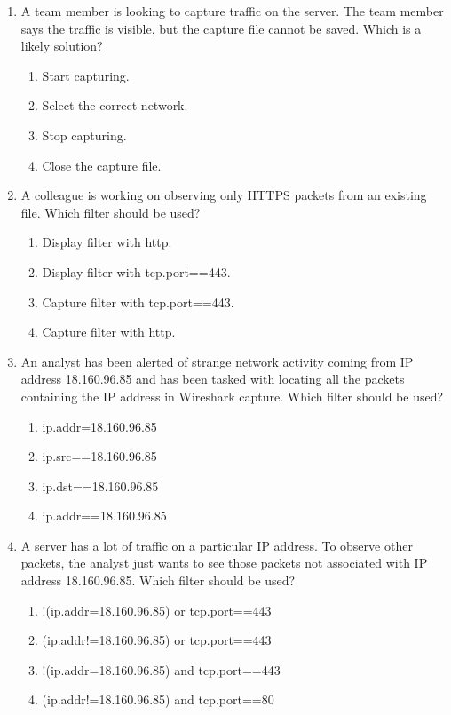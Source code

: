 \documentclass{article}
\newcommand{\incorrectOption}{\item[\textbf{\Circle}]}
\begin{document}
\begin{enumerate}[leftmargin=*, label=\textbf{Q\arabic*}, itemsep=-5pt]
\item A team member is looking to capture traffic on the server. The
  team member says the traffic is visible, but the capture file cannot
  be saved. Which is a likely solution? 
  \begin{enumerate}[itemsep=-3.5pt, label={}]
  \incorrectOption Start capturing.
  \incorrectOption Select the correct network. 
  \incorrectOption Stop capturing.
  \incorrectOption Close the capture file.
  \end{enumerate}  
 
\item A colleague is working on observing only HTTPS packets from an
  existing file. Which filter should be used?  
  \begin{enumerate}[itemsep=-3.5pt, label={}]
  \incorrectOption Display filter with {http}. 
  \incorrectOption Display filter with {tcp.port==443}.
  \incorrectOption Capture filter with {tcp.port==443}.
  \incorrectOption Capture filter with {http}.
  \end{enumerate}
 
\item An analyst has been alerted of strange network activity coming
  from IP address 18.160.96.85 and has been tasked with locating all
  the packets containing the IP address in Wireshark capture. Which
  filter should be used?  
  \begin{enumerate}[itemsep=-3.5pt, label={}]
  \incorrectOption ip.addr=18.160.96.85
  \incorrectOption ip.src==18.160.96.85
  \incorrectOption ip.dst==18.160.96.85
  \incorrectOption ip.addr==18.160.96.85
\end{enumerate}

\item A server has a lot of traffic on a particular IP address. To
  observe other packets, the analyst just wants to see those packets
  not associated with IP address 18.160.96.85. Which filter should be used? 
  \begin{enumerate}[itemsep=-3.5pt, label={}]
  \incorrectOption !(ip.addr=18.160.96.85) or tcp.port==443
  \incorrectOption (ip.addr!=18.160.96.85) or tcp.port==443
  \incorrectOption !(ip.addr=18.160.96.85) and tcp.port==443
  \incorrectOption (ip.addr!=18.160.96.85) and tcp.port==80
  \end{enumerate}
\end{enumerate}
\end{document}
